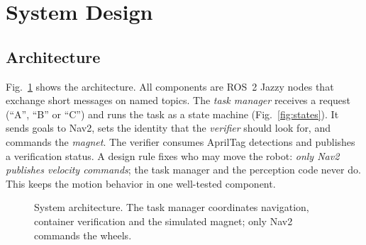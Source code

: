 \documentclass[conference]{IEEEtran}
\begin{document}
\section{System Design}\label{sec:design}
\subsection{Architecture}
Fig.~\ref{fig:arch} shows the architecture. All components are ROS~2 Jazzy nodes that exchange short messages on named topics. The \emph{task manager} receives a request (``A'', ``B'' or ``C'') and runs the task as a state machine (Fig.~\ref{fig:states}). It sends goals to Nav2, sets the identity that the \emph{verifier} should look for, and commands the \emph{magnet}. The verifier consumes AprilTag detections and publishes a verification status. A design rule fixes who may move the robot: \emph{only Nav2 publishes velocity commands}; the task manager and the perception code never do. This keeps the motion behavior in one well-tested component.

\begin{figure}[t]
\centering
{}
\caption{System architecture. The task manager coordinates navigation, container verification and the simulated magnet; only Nav2 commands the wheels.}
\label{fig:arch}
\end{figure}
\end{document}
